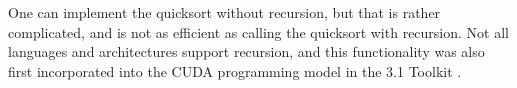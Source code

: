 One can implement the quicksort without recursion, but that is rather complicated, and is not as efficient as calling the quicksort with recursion. Not all languages and architectures support recursion, and this functionality was also first incorporated into the CUDA programming model in the 3.1 Toolkit \cite{cuda_3.1}.        